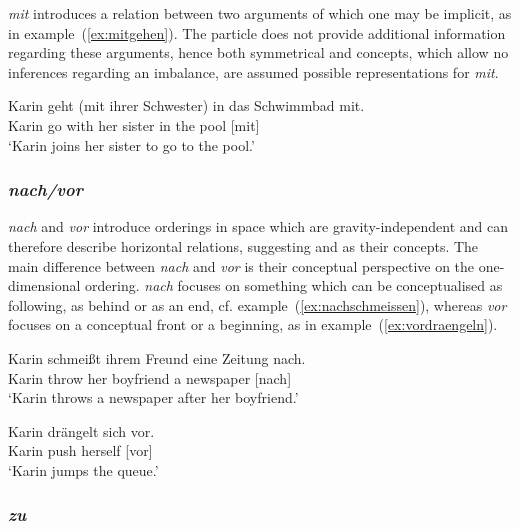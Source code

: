 \documentclass[output=paper]{langsci/langscibook}
\begin{document}
\textit{mit} introduces a relation between two arguments of which one
may be implicit, as in example~(\ref{ex:mitgehen}). The particle does
not provide additional information regarding these arguments, hence
both symmetrical  and  concepts,
which allow no inferences regarding an imbalance, are assumed possible
representations for \textit{mit}.

\ea\label{ex:mitgehen}
\gll Karin geht (mit ihrer Schwester) in das Schwimmbad mit.\\
Karin go with her sister in the pool [mit]\\
\glt `Karin joins her sister to go to the pool.'
\z


\subsubsection{\textit{nach/vor}}

\textit{nach} and \textit{vor} introduce orderings in space which are
gravity-independent and can therefore describe horizontal relations,
suggesting  and  as their
concepts. The main difference between \textit{nach} and \textit{vor}
is their conceptual perspective on the one-dimensional
ordering. \textit{nach} focuses on something which can be
conceptualised as following, as behind or as an end, cf.
example~(\ref{ex:nachschmeissen}), whereas \textit{vor} focuses on a
conceptual front or a beginning, as in
example~(\ref{ex:vordraengeln}).

\ea\label{ex:nachschmeissen}
\gll Karin schmeißt ihrem Freund eine Zeitung nach.\\
Karin throw her boyfriend a newspaper [nach]\\
\glt `Karin throws a newspaper after her boyfriend.' 
\z

\ea\label{ex:vordraengeln}
\gll Karin drängelt sich vor.\\
Karin push herself [vor]\\
\glt `Karin jumps the queue.'
\z


\subsubsection{\textit{zu}}
\end{document}
